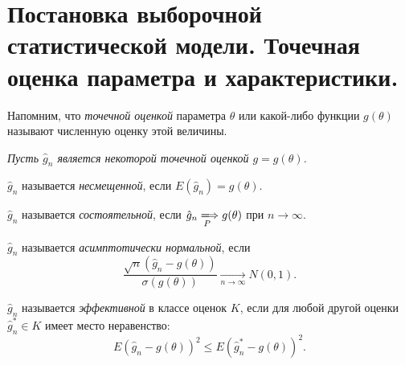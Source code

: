 \section{Постановка выборочной статистической модели. Точечная оценка параметра
  и характеристики.}

\begin{definition}
	Напомним, что \textit{точечной оценкой} параметра $\theta$ или какой-либо
	функции $g(\theta)$ называют численную оценку этой величины.
\end{definition}

\textit{Пусть $\hat{g}_n$ является некоторой точечной оценкой $g = g(\theta)$.}

\begin{definition}
	$\hat{g}_n$ называется \textit{несмещенной}, если $E(\hat{g}_n) = g(\theta).$
\end{definition}

\begin{definition}
	$\hat{g}_n$ называется \textit{состоятельной}, если
	$\hat{g}_n \xLongrightarrow[P]{} g(\theta)$ при $n \to \infty$.
\end{definition}

\begin{definition}
	$\hat{g}_n$ называется \textit{асимптотически нормальной}, если
	\[
		\frac{\sqrt{n}(\hat{g}_n - g(\theta))}{\sigma(g(\theta))}
	\xrightarrow[n \to \infty]{} N(0, 1)
	.\]
\end{definition}

\begin{definition}
	$\hat{g}_n$ называется \textit{эффективной} в классе оценок $K$, если для
	любой другой оценки $\hat{g}^*_n \in K$ имеет место неравенство:
	\[
		E(\hat{g}_n - g(\theta))^2 \leqslant E(\hat{g}^*_n - g(\theta))^2
	.\]
\end{definition}
